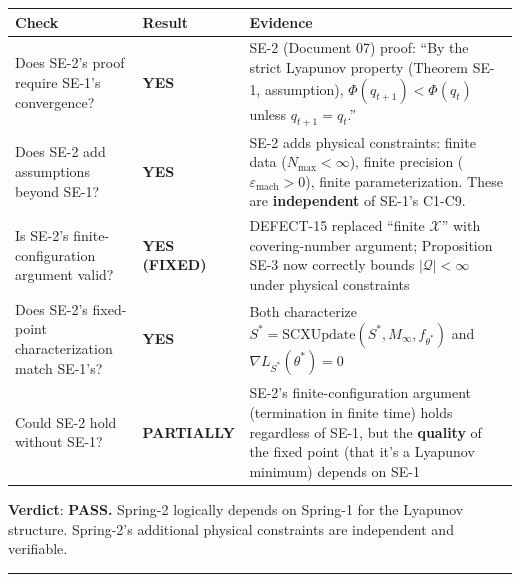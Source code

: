 \documentclass[
  12pt,
]{article}
\begin{document}
\begin{longtable}[]{@{}
  >{\raggedright\arraybackslash}p{}
  >{\raggedright\arraybackslash}p{}
  >{\raggedright\arraybackslash}p{}@{}}
\toprule\noalign{}
\begin{minipage}[b]{\linewidth}\raggedright
Check
\end{minipage} & \begin{minipage}[b]{\linewidth}\raggedright
Result
\end{minipage} & \begin{minipage}[b]{\linewidth}\raggedright
Evidence
\end{minipage} \\
\midrule\noalign{}
\endhead
\bottomrule\noalign{}
\endlastfoot
Does SE-2's proof require SE-1's convergence? & \textbf{YES} & SE-2
(Document 07) proof: ``By the strict Lyapunov property (Theorem SE-1,
assumption), \(\Phi(q_{t+1}) < \Phi(q_t)\) unless
\(q_{t+1} = q_t\).'' \\
Does SE-2 add assumptions beyond SE-1? & \textbf{YES} & SE-2 adds
physical constraints: finite data (\(N_{\max} < \infty\)), finite
precision (\(\varepsilon_{\text{mach}} > 0\)), finite parameterization.
These are \textbf{independent} of SE-1's C1-C9. \\
Is SE-2's finite-configuration argument valid? & \textbf{YES (FIXED)} &
DEFECT-15 replaced ``finite \(\mathcal{X}\)'' with covering-number
argument; Proposition SE-3 now correctly bounds
\(|\mathcal{Q}| < \infty\) under physical constraints \\
Does SE-2's fixed-point characterization match SE-1's? & \textbf{YES} &
Both characterize
\(S^* = \text{SCXUpdate}(S^*, M_\infty, f_{\theta^*})\) and
\(\nabla L_{S^*}(\theta^*) = 0\) \\
Could SE-2 hold without SE-1? & \textbf{PARTIALLY} & SE-2's
finite-configuration argument (termination in finite time) holds
regardless of SE-1, but the \textbf{quality} of the fixed point (that
it's a Lyapunov minimum) depends on SE-1 \\
\end{longtable}

\textbf{Verdict}: \textbf{PASS.} Spring-2 logically depends on Spring-1
for the Lyapunov structure. Spring-2's additional physical constraints
are independent and verifiable.

\begin{center}\rule{0.5\linewidth}{0.5pt}\end{center}
\end{document}
